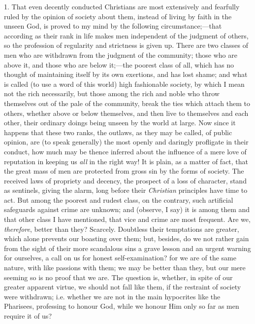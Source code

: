 1. That even decently conducted Christians are most
extensively and fearfully ruled by the opinion of society
about them, instead of living by faith in the unseen God,
is proved to my mind by the following
circumstance;—that according as their rank in life
makes men independent of the judgment of others, so the
profession of regularity and strictness is given up.
There are two classes of men who are withdrawn from the
judgment of the community; those who are above it, and
those who are below it;—the poorest class of all,
which has no thought of maintaining itself by its own
exertions, and has lost shame; and what is called (to use
a word of this world) high fashionable society, by which
I mean not the rich necessarily, but those among the rich
and noble who throw themselves out of the pale of the
community, break the ties which attach them to others,
whether above or below themselves, and then live to
themselves and each other, their ordinary doings being
unseen by the world at large. Now since it happens that
these two ranks, the outlaws, as they may be called, of
public opinion, are (to speak generally) the most openly
and daringly profligate in their conduct, how much may be
thence inferred about the influence of a mere love of
reputation in keeping us \emph{all} in the right way!
It is plain, as a matter of fact, that the great mass of
men are protected from gross sin by the forms of society.
The received laws of propriety and decency, the prospect
of a loss of character, stand as sentinels, giving the
alarm, long before their \emph{Christian} principles
have time to act. But among the poorest and rudest class,
on the contrary, such artificial safeguards against crime
are unknown; and (observe, I say) it is among them and
that other class I have mentioned, that vice
and crime are most frequent. Are we, \emph{therefore},
better than they? Scarcely. Doubtless their temptations
are greater, which alone prevents our boasting over them;
but, besides, do we not rather gain from the sight of
their more scandalous sins a grave lesson and an urgent
warning for ourselves, a call on us for honest
self-examination? for we are of the same nature, with
like passions with them; we may be better than they, but
our mere seeming so is no proof that we are. The question
is, whether, in spite of our greater apparent virtue, we
should not fall like them, if the restraint of society
were withdrawn; i.e. whether we are not in the main
hypocrites like the Pharisees, professing to honour God,
while we honour Him only so far as men require it of us?

